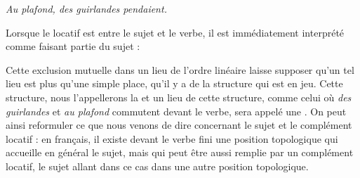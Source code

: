 \ea \textit{Au plafond, des guirlandes pendaient.} \z

Lorsque le locatif est entre le sujet et le verbe, il est immédiatement interprété comme faisant partie du sujet :

\z

Cette exclusion mutuelle dans un lieu de l’ordre linéaire laisse supposer qu’un tel lieu est plus qu’une simple place, qu’il y a de la structure qui est en jeu. Cette structure, nous l’appellerons la  et un lieu de cette structure, comme celui où \textit{des guirlandes} et \textit{au plafond} commutent devant le verbe, sera appelé une . On peut ainsi reformuler ce que nous venons de dire concernant le sujet et le complément locatif : en français, il existe devant le verbe fini une position topologique qui accueille en général le sujet, mais qui peut être aussi remplie par un complément locatif, le sujet allant dans ce cas dans une autre position topologique.

